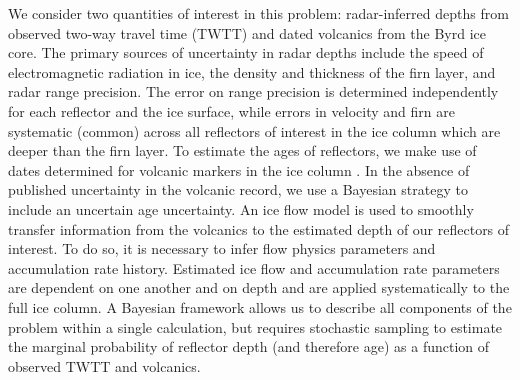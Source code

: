 
We consider two quantities of interest in this problem: radar-inferred depths from observed two-way travel time (TWTT) and dated volcanics from the Byrd ice core. The primary sources of uncertainty in radar depths include the speed of electromagnetic radiation in ice, the density and thickness of the firn layer, and radar range precision. The error on range precision is determined independently for each reflector and the ice surface, while errors in velocity and firn are systematic (common) across all reflectors of interest in the ice column which are deeper than the firn layer. To estimate the ages of reflectors, we make use of dates determined for volcanic markers in the ice column \citep{hammer1997}. %
In the absence of published uncertainty in the volcanic record, we use a Bayesian strategy to include an uncertain age uncertainty.
An ice flow model is used to smoothly transfer information from the volcanics to the estimated depth of our reflectors of interest. To do so, it is necessary to infer flow physics parameters and accumulation rate history. Estimated ice flow and accumulation rate parameters are dependent on one another and on depth and are applied systematically to the full ice column. A Bayesian framework allows us to describe all  components of the problem within a single calculation, but requires stochastic sampling to estimate the marginal probability of reflector depth (and therefore age) as a function of observed TWTT and volcanics.







